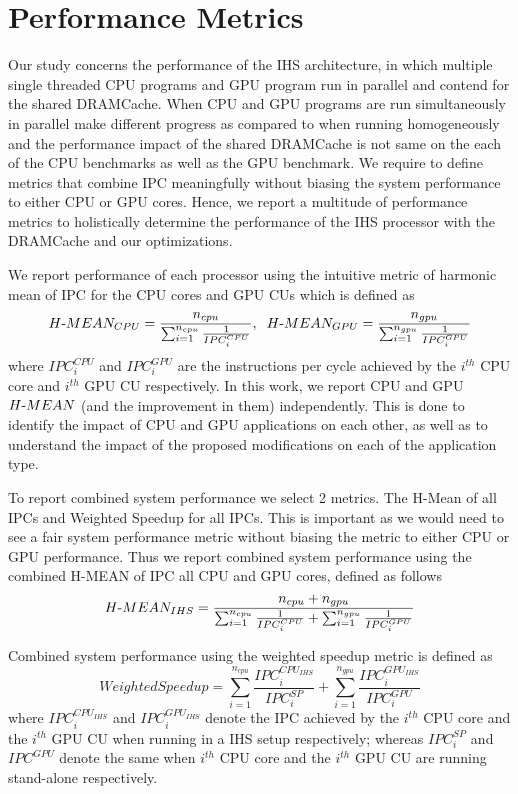\section{Performance Metrics} \label{perf-metrics}
Our study concerns the performance of the IHS architecture, in which multiple single threaded CPU programs and GPU program run in parallel and contend for the shared DRAMCache. When CPU and GPU programs are run simultaneously in parallel make different progress as compared to when running homogeneously and the performance impact of the shared DRAMCache is not same on the each of the CPU benchmarks as well as the GPU benchmark. We require to define metrics that combine IPC meaningfully without biasing the system performance to either CPU or GPU cores. Hence, we report a multitude of performance metrics to holistically determine the performance of the IHS processor with the DRAMCache and our optimizations. 
\par We report performance of each processor using the intuitive metric of harmonic mean of IPC for the CPU cores and GPU CUs which is defined as 
{
\begin{equation*}
H\textnormal{-}MEAN_{CPU} = \frac{n_{cpu}}{\sum_{i=1}^{n_{cpu}} \frac{1}{IPC_{i}^{CPU}}}, \hspace{0.2cm} H\textnormal{-}MEAN_{GPU} = \frac{n_{gpu}}{\sum_{i=1}^{n_{gpu}} \frac{1}{IPC_{i}^{GPU}}} 
\end{equation*}
}
where $IPC_i^{CPU}$ and $IPC_i^{GPU}$ are the instructions per cycle achieved by the $i^{th}$ CPU core and $i^{th}$ GPU CU respectively.
In this work, we report CPU and GPU $H\textnormal{-}MEAN$ (and the improvement in them) independently. This is done to identify the impact of CPU and GPU applications on each other, as well as to understand the impact of the proposed modifications on each of the application type. 

\par To report combined system performance we select 2 metrics. The H-Mean of all IPCs and Weighted Speedup for all IPCs. This is important as we would need to see a fair system performance metric without biasing the metric to either CPU or GPU performance. Thus we report combined system performance using the combined H-MEAN of IPC all CPU and GPU cores, defined as follows
{
\begin{equation*}
H\textnormal{-}MEAN_{IHS} = \frac{n_{cpu}+ n_{gpu}}{\sum_{i=1}^{n_{cpu}} \frac{1}{IPC_{i}^{CPU}} + \sum_{i=1}^{n_{gpu}} \frac{1}{IPC_{i}^{GPU}}} 
\end{equation*}
}
\par Combined system performance using the weighted speedup metric \cite{weighted-speedup} is defined as
{
\begin{equation*}
Weighted Speedup = \sum_{i=1}^{n_{cpu}} \frac{IPC_i^{CPU_{IHS}}}{IPC_i^{SP}} + \sum_{i=1}^{n_{gpu}} \frac{IPC_i^{GPU_{IHS}}}{IPC_i^{GPU}}
\end{equation*}
}
where ${IPC_i^{CPU_{IHS}}}$ and $IPC_i^{GPU_{IHS}}$ denote the IPC achieved by the $i^{th}$ CPU core and the $i^{th}$ GPU CU when running in a IHS setup respectively; whereas $IPC_i^{SP}$ and $IPC^{GPU}$ denote the same when $i^{th}$ CPU core and the $i^{th}$ GPU CU are running stand-alone respectively. 

